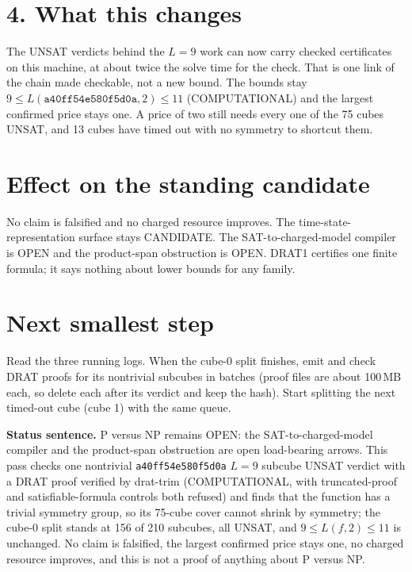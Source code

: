 \documentclass[11pt]{article}
\begin{document}
\section*{4. What this changes}
The UNSAT verdicts behind the $L=9$ work can now carry checked certificates on this machine, at about twice the solve time for the check. That is one link of the chain made checkable, not a new bound. The bounds stay $9\le L(\texttt{a40ff54e580f5d0a},2)\le 11$ (COMPUTATIONAL) and the largest confirmed price stays one. A price of two still needs every one of the 75 cubes UNSAT, and 13 cubes have timed out with no symmetry to shortcut them.

\section*{Effect on the standing candidate}
No claim is falsified and no charged resource improves. The time-state-representation surface stays CANDIDATE. The SAT-to-charged-model compiler is OPEN and the product-span obstruction is OPEN. DRAT1 certifies one finite formula; it says nothing about lower bounds for any family.

\section*{Next smallest step}
Read the three running logs. When the cube-0 split finishes, emit and check DRAT proofs for its nontrivial subcubes in batches (proof files are about 100\,MB each, so delete each after its verdict and keep the hash). Start splitting the next timed-out cube (cube 1) with the same queue.

\bigskip
\noindent\textbf{Status sentence.} P versus NP remains OPEN: the SAT-to-charged-model compiler and the product-span obstruction are open load-bearing arrows. This pass checks one nontrivial \texttt{a40ff54e580f5d0a} $L=9$ subcube UNSAT verdict with a DRAT proof verified by drat-trim (COMPUTATIONAL, with truncated-proof and satisfiable-formula controls both refused) and finds that the function has a trivial symmetry group, so its 75-cube cover cannot shrink by symmetry; the cube-0 split stands at 156 of 210 subcubes, all UNSAT, and $9\le L(f,2)\le 11$ is unchanged. No claim is falsified, the largest confirmed price stays one, no charged resource improves, and this is not a proof of anything about P versus NP.
\end{document}
